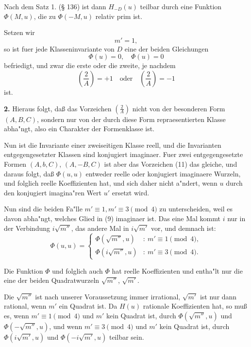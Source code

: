 \documentclass[12pt,a4paper]{article}
\theoremstyle{plain}
\theoremstyle{definition}
\theoremstyle{remark}
\begin{document}
Nach dem Satz 1. (\S{} 136) ist dann $H_{-D}(u)$ teilbar durch eine Funktion $\Phi(M, u)$, die zu $\Phi(-M, u)$ relativ prim ist.

Setzen wir
\begin{equation}\label{eq:138_9}
m' = 1,
\end{equation}
so ist fuer jede Klasseninvariante von $D$ eine der beiden Gleichungen
\begin{equation}\label{eq:138_10}
\Phi(u) = 0, \quad \Phi(u) = 0
\end{equation}
befriedigt, und zwar die erste oder die zweite, je nachdem
\begin{equation}\label{eq:138_11}
\left(\frac{2}{A}\right) = +1 \quad \text{oder} \quad \left(\frac{2}{A}\right) = -1
\end{equation}
ist.

\textbf{2.} Hieraus folgt, da\ss{} das Vorzeichen $\left(\frac{2}{A}\right)$ nicht von der besonderen Form $(A, B, C)$, sondern nur von der durch diese Form repraesentierten Klasse abha"ngt, also ein Charakter der Formenklasse ist.

Nun ist die Invariante einer zweiseitigen Klasse reell, und die Invarianten entgegengesetzter Klassen sind konjugiert imaginaer. Fuer zwei entgegengesetzte Formen $(A, b, C)$, $(A, -B, C)$ ist aber das Vorzeichen (11) das gleiche, und daraus folgt, da\ss{} $\Phi(u, u)$ entweder reelle oder konjugiert imaginaere Wurzeln, und folglich reelle Koeffizienten hat, und sich daher nicht a"ndert, wenn $u$ durch den konjugiert imagina"ren Wert $u'$ ersetzt wird.

Nun sind die beiden Fa"lle $m' \equiv 1, m' \equiv 3 \pmod{4}$ zu unterscheiden, weil es davon abha"ngt, welches Glied in (9) imaginaer ist. Das eine Mal kommt $i$ nur in der Verbindung $i\sqrt{m''}$, das andere Mal in $i\sqrt{m'}$ vor, und demnach ist:
\begin{equation}\label{eq:138_12}
\Phi(u, u) = \begin{cases}
\Phi(\sqrt{m''}, u) & :\ m' \equiv 1 \pmod{4},\\
\Phi(i\sqrt{m''}, u) & :\ m' \equiv 3 \pmod{4}.
\end{cases}
\end{equation}

Die Funktion $\Phi$ und folglich auch $\Phi$ hat reelle Koeffizienten und entha"lt nur die eine der beiden Quadratwurzeln $\sqrt{m''}$, $\sqrt{m'}$.

Die $\sqrt{m''}$ ist nach unserer Voraussetzung immer irrational, $\sqrt{m'}$ ist nur dann rational, wenn $m'$ ein Quadrat ist. Da $H(u)$ rationale Koeffizienten hat, so mu\ss{} es, wenn $m' \equiv 1 \pmod{4}$ und $m'$ kein Quadrat ist, durch $\Phi(\sqrt{m''}, u)$ und $\Phi(-\sqrt{m''}, u)$, und wenn $m' \equiv 3 \pmod{4}$ und $m'$ kein Quadrat ist, durch $\Phi(i\sqrt{m'}, u)$ und $\Phi(-i\sqrt{m'}, u)$ teilbar sein.
\end{document}
